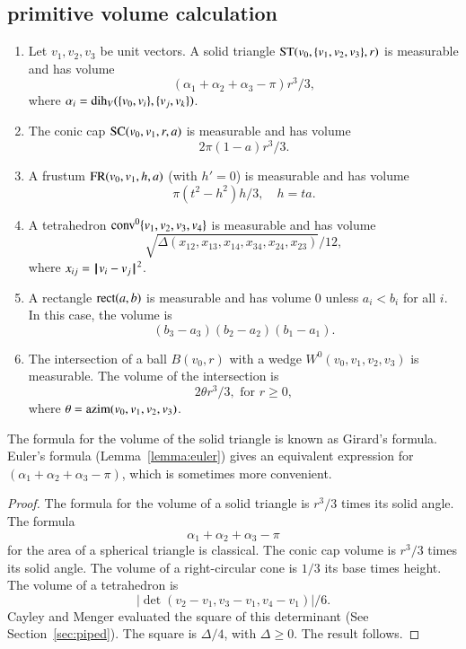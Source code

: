 \subsection{primitive volume calculation}\label{sec:primitive}

\begin{lemma} 
\begin{enumerate} 
 \item {} Let $v_1,v_2,v_3$ be unit vectors.
   A solid triangle ${\operatorname{ST}}(v_0,\{v_1,v_2,v_3\},r)$ is measurable and has volume
   $$
   (\alpha_1+\alpha_2+\alpha_3-\pi)r^3/3,
   $$
   where $\alpha_i = \operatorname{dih}_V(\{v_0,v_i\},\{v_j,v_k\})$.
  \item {} The conic cap ${\operatorname{SC}}(v_0,v_1,r,a)$ is measurable and has volume
   $$
    2\pi(1-a) r^3/3.
   $$
 \item {} A frustum ${\operatorname{FR}}(v_0,v_1,h,a)$ (with $h'=0$) 
is measurable and has volume
   $$
   \pi (t^2-h^2) h/3,\quad h = t a.
   $$
 \item{} A tetrahedron ${\operatorname{conv}}^0\{v_1,v_2,v_3,v_4\}$ is measurable and has volume
   $$
   \sqrt{\Delta(x_{12},x_{13},x_{14},x_{34},x_{24},x_{23})}/12,
   $$
   where $x_{ij} = {\hskip0.1em|\hskip-0.15em|\hskip0.1em}v_i - v_j{\hskip0.1em|\hskip-0.15em|\hskip0.1em}^2$.
\item{} A rectangle ${\operatorname{rect}}(a,b)$ is measurable and
has volume $0$ unless $a_i<b_i$ for all $i$.  In this case, the
volume is
$$(b_3-a_3)(b_2-a_2)(b_1-a_1).$$
 \item{} The intersection of a ball $B(v_0,r)$ with a wedge
 $W^0(v_0,v_1,v_2,v_3)$ is measurable.  The volume of the intersection
is 
   $$
   2 \theta r^3/3,\text{ for } r \ge 0,
   $$
where $\theta = {\operatorname{azim}}(v_0,v_1,v_2,v_3)$.

\end{enumerate}
\end{lemma}

The formula for the volume of the solid triangle is known as Girard's formula.
Euler's formula (Lemma~\ref{lemma:euler}) gives an
equivalent expression for $(\alpha_1+\alpha_2+\alpha_3-\pi)$, which is sometimes more convenient.
%
%

\begin{proof}
The formula for the volume of a solid triangle is $r^3/3$ times
its solid angle.  The formula 
   $$\alpha_1+\alpha_2+\alpha_3-\pi$$
for the area of a spherical triangle is classical.    
The conic cap volume is
$r^3/3$ times its solid angle.  
The volume of a right-circular cone is $1/3$ its base times height.
The volume of a tetrahedron is
   $$|\det(v_2-v_1,v_3-v_1,v_4-v_1)|/6.$$
Cayley and Menger evaluated the square of this determinant (See Section~\ref{sec:piped}).  The square is
$\Delta/4$, with $\Delta\ge0$.  The result follows.
\end{proof}
%



